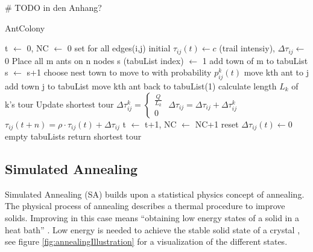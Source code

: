 \# TODO in den Anhang?
\begin{breakablealgorithm}
	\caption{AntColony}
	\label{alg:AntColony}
	\begin{algorithmic}[1]
		\STATE t $\gets$ 0,  NC $\gets$ 0
		\STATE set for all edges(i,j) initial $\tau_{ij}(t) \gets c$ (trail intensiy), $\Delta \tau_{ij} \gets$ 0 
		\STATE Place all m ants on n nodes
		\STATE s (tabuList index) $\gets$ 1
			\STATE add town of m to tabuList
				\STATE s $\gets$ s+1
					\STATE choose nest town to move to with probability $p_{ij}^k(t)$
					\STATE move kth ant to j
					\STATE add town j to tabuList
				\ENDFOR
			\ENDWHILE
				\STATE move kth ant back to tabuList(1)
				\STATE calculate length $L_k$ of k's tour
				\STATE Update shortest tour
						\STATE $\Delta\tau_{ij}^k = \begin{cases}
							\frac{Q}{L_k}\\
							0
						\end{cases}$
						\STATE $\Delta\tau_{ij} = \Delta\tau_{ij} + \Delta\tau_{ij}^k$
					\ENDFOR
				\ENDFOR
			\ENDFOR
				\STATE $\tau_{ij}(t+n)=\rho \cdot \tau_{ij}(t) + \Delta\tau_{ij}$
			\ENDFOR
			\STATE t $\gets$ t+1, NC $\gets$ NC+1
				\STATE reset $\Delta\tau_{ij}(t) \gets 0$
			\ENDFOR
				\STATE empty tabuLists
			\ELSE
				\STATE return shortest tour
			\ENDIF
		\ENDFOR
	\end{algorithmic}	
\end{breakablealgorithm}

\subsection{Simulated Annealing}
\label{subsec:simulatedAnnealingBackground}

Simulated Annealing (SA) builds upon a statistical physics concept of annealing.
The physical process of annealing describes a thermal procedure to improve solids.
Improving in this case means \enquote{obtaining low energy states of a solid in a heat bath} \cite{aarts_simulated_2005}.
Low energy is needed to achieve the stable solid state of a crystal \cite{delahaye_simulated_2019}, see figure \ref{fig:annealingIllustration} for a visualization of the different states.

